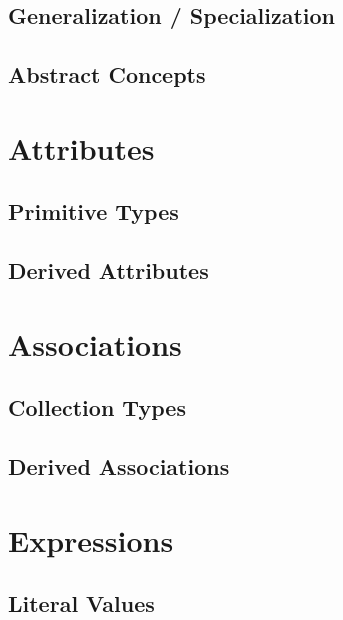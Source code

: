 \documentclass[a4paper,oneside,12pt, extrafontsizes]{memoir}
\theoremstyle{definition}
\theoremstyle{definition}
\theoremstyle{definition}
\theoremstyle{definition}
\theoremstyle{definition}
\begin{document}
\section{Generalization / Specialization}
\label{sec:generalization}


\section{Abstract Concepts}
\label{sec:abstract}


\chapter{Attributes}
\label{ch:attributes}


\section{Primitive Types}
\label{sec:primitive-types}


\section{Derived Attributes}
\label{sec:derived-attributes}

\chapter{Associations}
\label{ch:associations}


\section{Collection Types}
\label{sec:collections}

\section{Derived Associations}
\label{sec:derived-associations}

\chapter{Expressions}
\label{ch:expressions}


\section{Literal Values}
\label{sec:literals}

\end{document}
